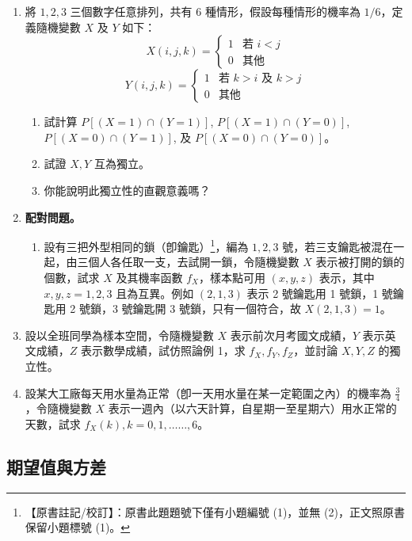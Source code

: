 \begin{enumerate}[label=\textbf{\arabic*.}]
  \item 將 $1, 2, 3$ 三個數字任意排列，共有 6 種情形，假設每種情形的機率為 $1/6$，定義隨機變數 $X$ 及 $Y$ 如下：
  \[
  X(i, j, k) = \begin{cases}
  1 & \text{若 } i < j \\
  0 & \text{其他}
  \end{cases}
  \]
  \[
  Y(i, j, k) = \begin{cases}
  1 & \text{若 } k > i \text{ 及 } k > j \\
  0 & \text{其他}
  \end{cases}
  \]
  \begin{enumerate}[(1)]
    \item 試計算 $P[(X = 1) \cap (Y = 1)]$, $P[(X = 1) \cap (Y = 0)]$, $P[(X = 0) \cap (Y = 1)]$, 及 $P[(X = 0) \cap (Y = 0)]$。
    \item 試證 $X, Y$ 互為獨立。
    \item 你能說明此獨立性的直觀意義嗎？
  \end{enumerate}

  \item \textbf{配對問題。}
  \begin{enumerate}[(1)]
    \item 設有三把外型相同的鎖（卽鑰匙）\label{note:b5-ch5-p153-q6}\footnote{【原書註記/校訂】：原書此題題號下僅有小題編號 (1)，並無 (2)，正文照原書保留小題標號 (1)。}，編為 $1, 2, 3$ 號，若三支鑰匙被混在一起，由三個人各任取一支，去試開一鎖，令隨機變數 $X$ 表示被打開的鎖的個數，試求 $X$ 及其機率函數 $f_X$，樣本點可用 $(x, y, z)$ 表示，其中 $x, y, z = 1, 2, 3$ 且為互異。例如 $(2, 1, 3)$ 表示 2 號鑰匙用 1 號鎖，1 號鑰匙用 2 號鎖，3 號鑰匙開 3 號鎖，只有一個符合，故 $X(2, 1, 3) = 1$。
  \end{enumerate}

  \item 設以全班同學為樣本空間，令隨機變數 $X$ 表示前次月考國文成績，$Y$ 表示英文成績，$Z$ 表示數學成績，試仿照論例 1，求 $f_X, f_Y, f_Z$，並討論 $X, Y, Z$ 的獨立性。

  \item 設某大工廠每天用水量為正常（卽一天用水量在某一定範圍之內）的機率為 $\frac{3}{4}$，令隨機變數 $X$ 表示一週內（以六天計算，自星期一至星期六）用水正常的天數，試求 $f_X(k), k = 0, 1, \dots\dots, 6$。
\end{enumerate}
\subsection{期望值與方差}\label{sec:b5-5-2}

